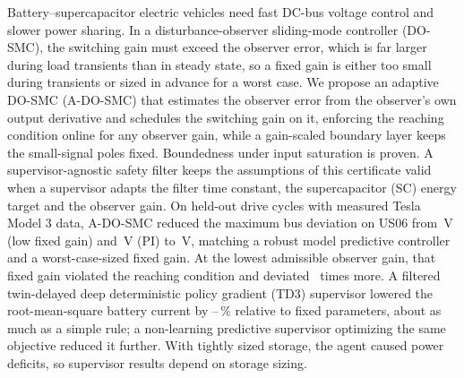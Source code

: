 Battery--supercapacitor electric vehicles need fast DC-bus voltage control and slower power sharing. In a disturbance-observer sliding-mode controller (DO-SMC), the switching gain must exceed the observer error, which is far larger during load transients than in steady state, so a fixed gain is either too small during transients or sized in advance for a worst case. We propose an adaptive DO-SMC (A-DO-SMC) that estimates the observer error from the observer's own output derivative and schedules the switching gain on it, enforcing the reaching condition online for any observer gain, while a gain-scaled boundary layer keeps the small-signal poles fixed. Boundedness under input saturation is proven. A supervisor-agnostic safety filter keeps the assumptions of this certificate valid when a supervisor adapts the filter time constant, the supercapacitor (SC) energy target and the observer gain. On held-out drive cycles with measured Tesla Model 3 data, A-DO-SMC reduced the maximum bus deviation on US06 from \TOneLoUSMax\,V (low fixed gain) and \TOnePIUSMax\,V (PI) to \TOneAUSMax\,V, matching a robust model predictive controller and a worst-case-sized fixed gain. At the lowest admissible observer gain, that fixed gain violated the reaching condition and deviated \LamFactorHi\ times more. A filtered twin-delayed deep deterministic policy gradient (TD3) supervisor lowered the root-mean-square battery current by --\,\% relative to fixed parameters, about as much as a simple rule; a non-learning predictive supervisor optimizing the same objective reduced it further. With tightly sized storage, the agent caused power deficits, so supervisor results depend on storage sizing.

